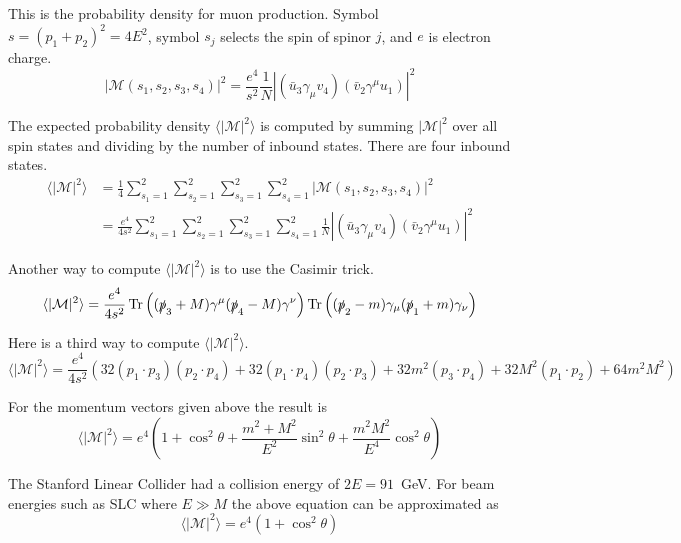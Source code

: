 \documentclass[12pt]{article}
\begin{document}
\bigskip
\noindent
This is the probability density for muon production.
Symbol $s=(p_1+p_2)^2=4E^2$,
symbol $s_j$ selects the spin of spinor $j$,
and $e$ is electron charge.
\begin{equation*}
|\mathcal{M}(s_1,s_2,s_3,s_4)|^2
=\frac{e^4}{s^2}\frac{1}{N}\left|(\bar{u}_3\gamma_\mu v_4)(\bar{v}_2\gamma^\mu u_1)\right|^2
\end{equation*}

\noindent
The expected probability density $\langle|\mathcal{M}|^2\rangle$
is computed by summing $|\mathcal{M}|^2$ over all spin states
and dividing by the number of inbound states.
There are four inbound states.
\begin{align*}
\langle|\mathcal{M}|^2\rangle
&=\frac{1}{4}\sum_{s_1=1}^2\sum_{s_2=1}^2\sum_{s_3=1}^2\sum_{s_4=1}^2|\mathcal{M}(s_1,s_2,s_3,s_4)|^2
\\
&=\frac{e^4}{4s^2}\sum_{s_1=1}^2\sum_{s_2=1}^2\sum_{s_3=1}^2\sum_{s_4=1}^2
\frac{1}{N}\left|(\bar{u}_3\gamma_\mu v_4)(\bar{v}_2\gamma^\mu u_1)\right|^2
\end{align*}

\noindent
Another way to compute $\langle|\mathcal{M}|^2\rangle$ is to use the Casimir trick.
\begin{equation*}
\langle|\mathcal{M}|^2\rangle
=\frac{e^4}{4s^2}
\mathop{\rm Tr}\left((\slashed{p}_3+M)\gamma^\mu(\slashed{p}_4-M)\gamma^\nu\right)
\mathop{\rm Tr}\left((\slashed{p}_2-m)\gamma_\mu(\slashed{p}_1+m)\gamma_\nu\right)
\end{equation*}

\noindent
Here is a third way to compute $\langle|\mathcal{M}|^2\rangle$.
\begin{equation*}
\langle|\mathcal{M}|^2\rangle
=\frac{e^4}{4s^2}
\left(
32 (p_1\cdot p_3) (p_2\cdot p_4) +
32 (p_1\cdot p_4) (p_2\cdot p_3) +
32 m^2 (p_3\cdot p_4) +
32 M^2 (p_1\cdot p_2) +
64 m^2 M^2
\right)
\end{equation*}

\noindent
For the momentum vectors given above the result is
\begin{equation*}
\langle|\mathcal{M}|^2\rangle
=e^4\left(1+\cos^2\theta+\frac{m^2+M^2}{E^2}\sin^2\theta+\frac{m^2M^2}{E^4}\cos^2\theta\right)
\end{equation*}

\noindent
The Stanford Linear Collider
had a collision energy of $2E=91$~GeV.
For beam energies such as SLC where $E\gg M$ the above equation can be approximated as
$$
\langle|\mathcal{M}|^2\rangle=e^4(1+\cos^2\theta)
$$
\end{document}
